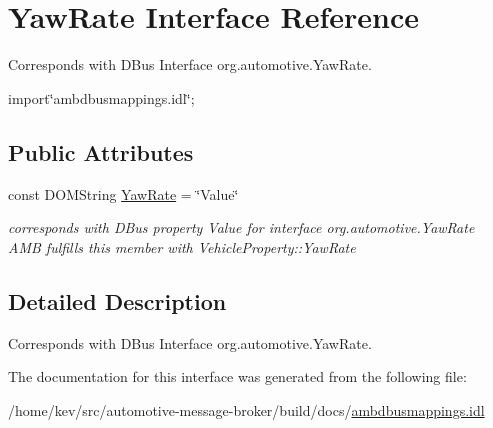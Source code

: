 \hypertarget{interfaceYawRate}{\section{Yaw\+Rate Interface Reference}
\label{interfaceYawRate}
}


Corresponds with D\+Bus Interface org.\+automotive.\+Yaw\+Rate.  




{\ttfamily import\char`\"{}ambdbusmappings.\+idl\char`\"{};}

\subsection*{Public Attributes}
\begin{DoxyCompactItemize}
\item 
\hypertarget{interfaceYawRate_a2ce33bd6e0077d22f8f3b137dacc80ad}{const D\+O\+M\+String \hyperlink{interfaceYawRate_a2ce33bd6e0077d22f8f3b137dacc80ad}{Yaw\+Rate} = \char`\"{}Value\char`\"{}}\label{interfaceYawRate_a2ce33bd6e0077d22f8f3b137dacc80ad}

\begin{DoxyCompactList}\small\item\em corresponds with D\+Bus property Value for interface org.\+automotive.\+Yaw\+Rate A\+M\+B fulfills this member with Vehicle\+Property\+::\+Yaw\+Rate \end{DoxyCompactList}\end{DoxyCompactItemize}


\subsection{Detailed Description}
Corresponds with D\+Bus Interface org.\+automotive.\+Yaw\+Rate. 

The documentation for this interface was generated from the following file\+:\begin{DoxyCompactItemize}
\item 
/home/kev/src/automotive-\/message-\/broker/build/docs/\hyperlink{ambdbusmappings_8idl}{ambdbusmappings.\+idl}\end{DoxyCompactItemize}

